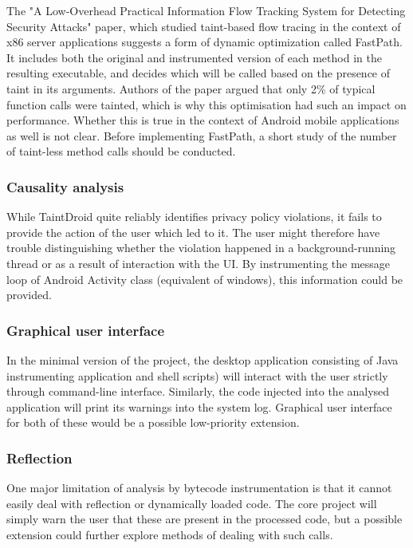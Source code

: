 \documentclass[12pt]{article}
\begin{document}
The "A Low-Overhead Practical Information Flow Tracking System for 
Detecting Security Attacks" paper, which studied taint-based flow tracing 
in the context of x86 server applications suggests a form of dynamic 
optimization called FastPath. It includes both the original and 
instrumented version of each method in the resulting executable, and
decides which will be called based on the presence of taint in its 
arguments. Authors of the paper argued that only 2\% of typical function
calls were tainted, which is why this optimisation had such an impact
on performance. Whether this is true in the context of Android mobile
applications as well is not clear. Before implementing FastPath, a short 
study of the number of taint-less method calls should be conducted.

\subsubsection*{Causality analysis}

While TaintDroid quite reliably identifies privacy policy violations,
it fails to provide the action of the user which led to it. The user 
might therefore have trouble distinguishing whether the violation 
happened in a background-running thread or as a result of interaction
with the UI. By instrumenting the message loop of Android Activity class
(equivalent of windows), this information could be provided.

\subsubsection*{Graphical user interface}

In the minimal version of the project, the desktop application consisting of
Java instrumenting application and shell scripts) will interact with the user
strictly through command-line interface. Similarly, the code injected into 
the analysed application will print its warnings into the system log. 
Graphical user interface for both of these would be a possible low-priority 
extension.

\subsubsection*{Reflection}

One major limitation of analysis by bytecode instrumentation is that it 
cannot easily deal with reflection or dynamically loaded code. The core
project will simply warn the user that these are present in the processed
code, but a possible extension could further explore methods of dealing 
with such calls.
\end{document}
